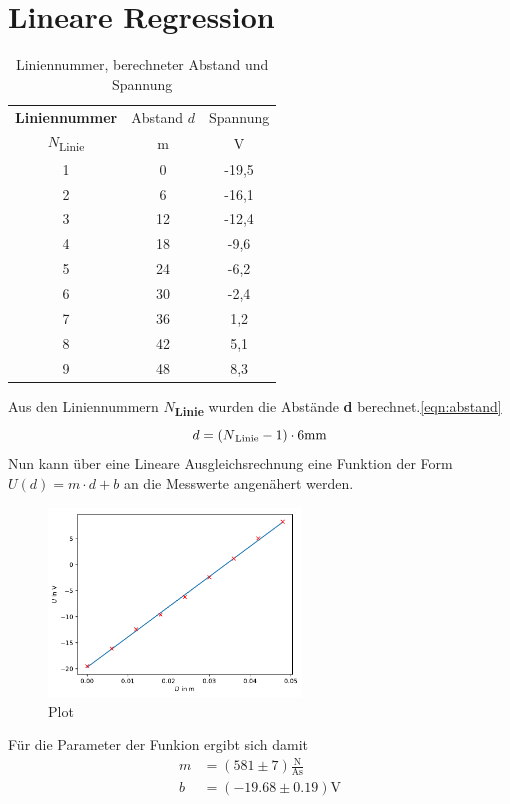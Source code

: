 \documentclass[titlepage = firstcover]{scrartcl}
\begin{document}
\newpage

\section{Lineare Regression}
\begin{table}[H]
    \centering
    \begin{tabular}{c c c}
        \toprule
        \textbf{Liniennummer} & Abstand $d$ & Spannung \\
        $N$\textsubscript{Linie} & m & V \\
        \midrule
        1 & 0 & -19,5\\
        2 & 6 & -16,1\\
        3 & 12 & -12,4\\
        4 & 18 & -9,6\\
        5 & 24 & -6,2\\
        6 & 30 & -2,4\\
        7 & 36 & 1,2\\
        8 & 42 & 5,1\\
        9 & 48 & 8,3\\
        \bottomrule
    \end{tabular}
    \caption{Liniennummer, berechneter Abstand und Spannung}
    \label{tab:Wertetabelle}
\end{table}
Aus den Liniennummern \textbf{$N$\textsubscript{Linie}} wurden die Abstände \textbf{d} berechnet.\ref{eqn:abstand}
\begin{equation}
    d = (N\text{\textsubscript{Linie}}-1)\cdot 6 \text{mm}
    \label{eqn:abstand}
\end{equation}
Nun kann über eine Lineare Ausgleichsrechnung eine Funktion der Form $U(d) = m\cdot d + b$ an die Messwerte angenähert werden.
\begin{figure}[H]
    \center
    \includegraphics[width=0.6\textwidth]{build/plot.pdf}
    \caption{Plot}
    \label{tab:LF_D}
\end{figure}
Für die Parameter der Funkion ergibt sich damit
\begin{align*}
    m &= (581\pm 7) \frac{\text{N}}{\text{As}}\\
    b &= \left(-19.68\pm 0.19\right) \text{V}
\end{align*}
\end{document}
